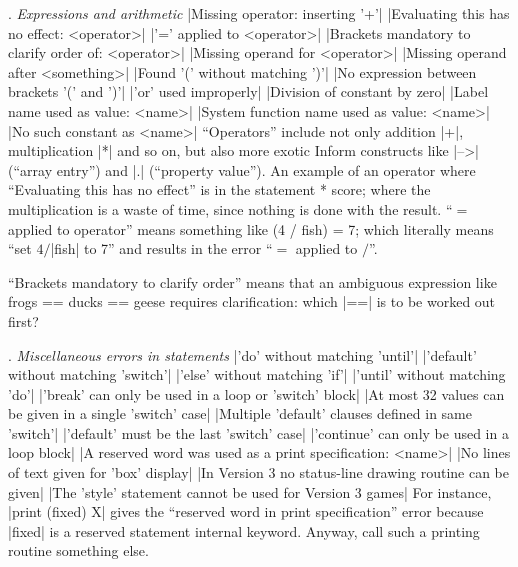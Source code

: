 \medskip{}. {\sl Expressions and arithmetic}
\beginlines
|Missing operator: inserting '+'|
|Evaluating this has no effect: <operator>|
|'=' applied to <operator>|
|Brackets mandatory to clarify order of: <operator>|
|Missing operand for <operator>|
|Missing operand after <something>|
|Found '(' without matching ')'|
|No expression between brackets '(' and ')'|
|'or' used improperly|
|Division of constant by zero|
|Label name used as value: <name>|
|System function name used as value: <name>|
|No such constant as <name>|
\endlines
``Operators'' include not only addition |+|, multiplication |*| and so on,
but also more exotic Inform constructs like |-->| (``array entry'') and
|.| (``property value'').  An example of an operator where ``Evaluating
this has no effect'' is in the statement
 * score;
\endtt
where the multiplication is a waste of time, since nothing is done with the
result.  ``$=$ applied to operator'' means something like
\beginstt
    (4 / fish) = 7;
\endtt
which literally means ``set $4/$|fish| to 7'' and results in the error
``$=$ applied to $/$''.

``Brackets mandatory to clarify order'' means that an ambiguous expression
like
\beginstt
    frogs == ducks == geese
\endtt
requires clarification: which |==| is to be worked out first?

\medskip{}. {\sl Miscellaneous errors in statements}
\beginlines
|'do' without matching 'until'|
|'default' without matching 'switch'|
|'else' without matching 'if'|
|'until' without matching 'do'|
|'break' can only be used in a loop or 'switch' block|
|At most 32 values can be given in a single 'switch' case|
|Multiple 'default' clauses defined in same 'switch'|
|'default' must be the last 'switch' case|
|'continue' can only be used in a loop block|
|A reserved word was used as a print specification: <name>|
|No lines of text given for 'box' display|
|In Version 3 no status-line drawing routine can be given|
|The 'style' statement cannot be used for Version 3 games|
\endlines
For instance, |print (fixed) X| gives the ``reserved word in print
specification'' error because |fixed| is a reserved statement internal
keyword.  Anyway, call such a printing routine something else.

